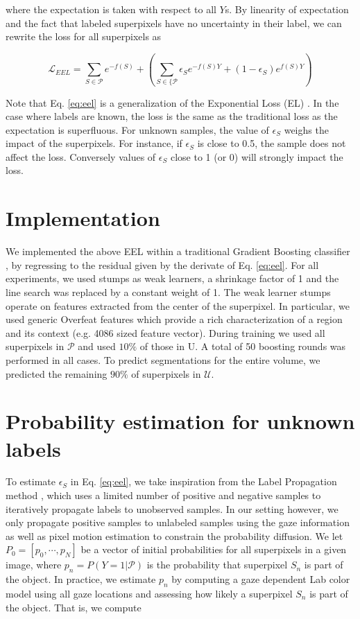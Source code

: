 where the expectation is taken with respect to all $Y$s.
By linearity of expectation and the fact that labeled superpixels have no uncertainty in their label, we can rewrite the loss for all superpixels as

\begin{equation}
  \label{eq:eel}
  \mathcal{L}_{EEL} = \sum_{S \in \mathcal{P}} e^{-f(S)} + \left( \sum_{S \in \{ \mathcal{P}} \epsilon_{S} e^{-f(S)Y} + (1-\epsilon_{S}) e^{f(S)Y}\right)
\end{equation}

Note that Eq. \ref{eq:eel} is a generalization of the Exponential Loss (EL) \cite{hastie09}.
In the case where labels are known, the loss is the same as the traditional loss as the expectation is superfluous.
For unknown samples, the value of $\epsilon_{S}$ weighs the impact of the superpixels.
For instance, if $\epsilon_{S}$ is close to 0.5, the sample does not affect the loss.
Conversely values of $\epsilon_{S}$ close to 1 (or 0) will strongly impact the loss.

\section{Implementation}
We implemented the above EEL within a traditional Gradient Boosting classifier \cite{hastie09},
by regressing to the residual given by the derivate of Eq. \ref{eq:eel}.
For all experiments, we used stumps as weak learners, a shrinkage factor of 1 and the line search was replaced by a constant weight of 1.
The weak learner stumps operate on features extracted from the center of the superpixel.
In particular, we used generic Overfeat features \cite{sermanet13} which provide a rich
characterization of a region and its context (e.g. 4086 sized feature vector).
During training we used all superpixels in $\mathcal{P}$ and used $10\%$ of those in U.
A total of 50 boosting rounds was performed in all cases.
To predict segmentations for the entire volume, we
predicted the remaining $90\%$ of superpixels in $\mathcal{U}$.

\section{Probability estimation for unknown labels}
\label{sec:eel_estim}
To estimate $\epsilon_{S}$ in Eq. \ref{eq:eel}, we take inspiration from the Label Propagation method \cite{zhou04}, which uses a limited number of positive and negative samples to iteratively propagate labels to unobserved samples.
In our setting however, we only propagate positive samples to unlabeled
samples using the gaze information as well as pixel motion estimation to constrain the probability diffusion.
We let $P_{0} = \left[p_0,\cdots, p_{N}\right]$ be a vector of initial probabilities for all superpixels in a given image, where $p_n = P(Y = 1|\mathcal{P})$ is the probability that superpixel $S_{n}$ is part of the object.
In practice, we estimate $p_{n}$ by computing a gaze dependent Lab color model using all gaze
locations and assessing how likely a superpixel $S_{n}$ is part of the object.
That is, we compute

